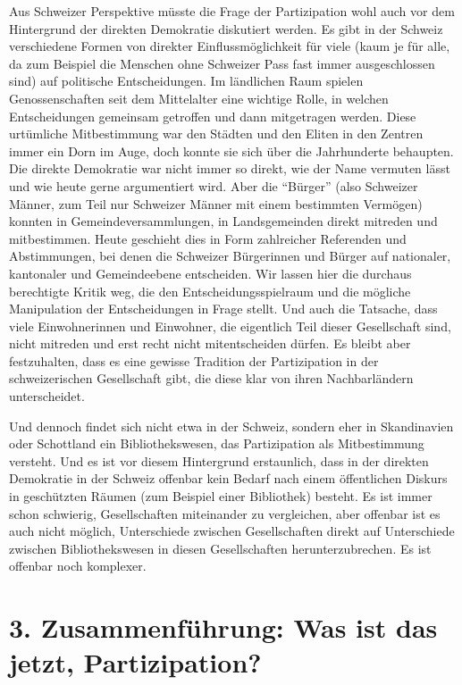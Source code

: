 \documentclass[a4paper,
fontsize=11pt,
oneside,
numbers=noperiodatend,
parskip=half-,
bibliography=totoc,
final
]{scrartcl}
\begin{document}
Aus Schweizer Perspektive müsste die Frage der Partizipation wohl auch
vor dem Hintergrund der direkten Demokratie diskutiert werden. Es gibt
in der Schweiz verschiedene Formen von direkter Einflussmöglichkeit für
viele (kaum je für alle, da zum Beispiel die Menschen ohne Schweizer
Pass fast immer ausgeschlossen sind) auf politische Entscheidungen. Im
ländlichen Raum spielen Genossenschaften seit dem Mittelalter eine
wichtige Rolle, in welchen Entscheidungen gemeinsam getroffen und dann
mitgetragen werden. Diese urtümliche Mitbestimmung war den Städten und
den Eliten in den Zentren immer ein Dorn im Auge, doch konnte sie sich
über die Jahrhunderte behaupten. Die direkte Demokratie war nicht immer
so direkt, wie der Name vermuten lässt und wie heute gerne argumentiert
wird. Aber die \enquote{Bürger} (also Schweizer Männer, zum Teil nur
Schweizer Männer mit einem bestimmten Vermögen) konnten in
Gemeindeversammlungen, in Landsgemeinden direkt mitreden und
mitbestimmen. Heute geschieht dies in Form zahlreicher Referenden und
Abstimmungen, bei denen die Schweizer Bürgerinnen und Bürger auf
nationaler, kantonaler und Gemeindeebene entscheiden. Wir lassen hier
die durchaus berechtigte Kritik weg, die den Entscheidungsspielraum und
die mögliche Manipulation der Entscheidungen in Frage stellt. Und auch
die Tatsache, dass viele Einwohnerinnen und Einwohner, die eigentlich
Teil dieser Gesellschaft sind, nicht mitreden und erst recht nicht
mitentscheiden dürfen. Es bleibt aber festzuhalten, dass es eine gewisse
Tradition der Partizipation in der schweizerischen Gesellschaft gibt,
die diese klar von ihren Nachbarländern unterscheidet.

Und dennoch findet sich nicht etwa in der Schweiz, sondern eher in
Skandinavien oder Schottland ein Bibliothekswesen, das Partizipation als
Mitbestimmung versteht. Und es ist vor diesem Hintergrund erstaunlich,
dass in der direkten Demokratie in der Schweiz offenbar kein Bedarf nach
einem öffentlichen Diskurs in geschützten Räumen (zum Beispiel einer
Bibliothek) besteht. Es ist immer schon schwierig, Gesellschaften
miteinander zu vergleichen, aber offenbar ist es auch nicht möglich,
Unterschiede zwischen Gesellschaften direkt auf Unterschiede zwischen
Bibliothekswesen in diesen Gesellschaften herunterzubrechen. Es ist
offenbar noch komplexer.

\section{3. Zusammenführung: Was ist das jetzt,
Partizipation?}\label{zusammenfuxfchrung-was-ist-das-jetzt-partizipation}
\end{document}
